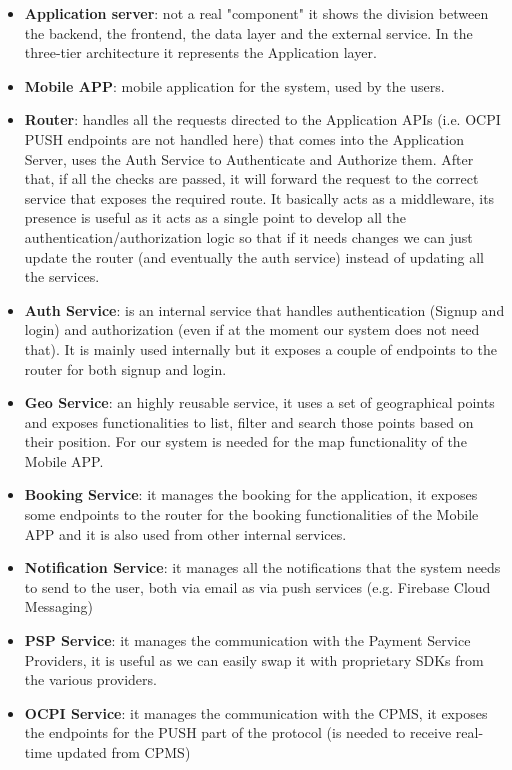 \begin{itemize}
	\item \textbf{Application server}: not a real "component" it shows the division between the backend, the frontend, the data layer and the external service. In the three-tier architecture it represents the Application layer.
	\item \textbf{Mobile APP}: mobile application for the system, used by the users.
	\item \textbf{Router}: handles all the requests directed to the Application APIs (i.e. OCPI PUSH endpoints are not handled here) that comes into the Application Server, uses the Auth Service to Authenticate and Authorize them. After that, if all the checks are passed, it will forward the request to the correct service that exposes the required route. It basically acts as a middleware, its presence is useful as it acts as a single point to develop all the authentication/authorization logic so that if it needs changes we can just update the router (and eventually the auth service) instead of updating all the services.
	\item \textbf{Auth Service}: is an internal service that handles authentication (Signup and login) and authorization (even if at the moment our system does not need that). It is mainly used internally but it exposes a couple of endpoints to the router for both signup and login.
	\item \textbf{Geo Service}: an highly reusable service, it uses a set of geographical points and exposes functionalities to list, filter and search those points based on their position. For our system is needed for the map functionality of the Mobile APP.
	\item \textbf{Booking Service}: it manages the booking for the application, it exposes some endpoints to the router for the booking functionalities of the Mobile APP and it is also used from other internal services.
	\item \textbf{Notification Service}: it manages all the notifications that the system needs to send to the user, both via email as via push services (e.g. Firebase Cloud Messaging)
	\item \textbf{PSP Service}: it manages the communication with the Payment Service Providers, it is useful as we can easily swap it with proprietary SDKs from the various providers.
	\item \textbf{OCPI Service}: it manages the communication with the CPMS, it exposes the endpoints for the PUSH part of the protocol (is needed to receive real-time updated from CPMS)

\end{itemize}
